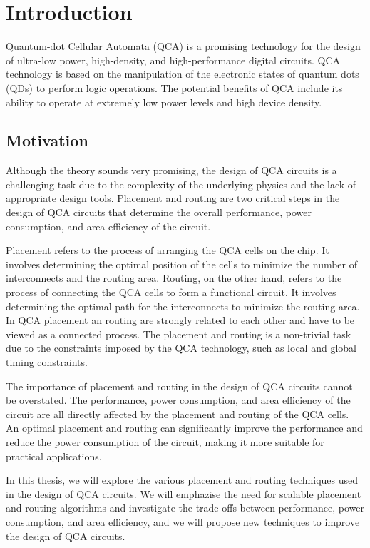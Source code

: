 
\chapter{Introduction}\label{chapter:introduction}
Quantum-dot Cellular Automata (QCA) is a promising technology for the design of ultra-low power, high-density, and high-performance digital circuits. QCA technology is based on the manipulation of the electronic states of quantum dots (QDs) to perform logic operations. The potential benefits of QCA include its ability to operate at extremely low power levels and high device density.

\section{Motivation}
Although the theory sounds very promising, the design of QCA circuits is a challenging task due to the complexity of the underlying physics and the lack of appropriate design tools. Placement and routing are two critical steps in the design of QCA circuits that determine the overall performance, power consumption, and area efficiency of the circuit.

Placement refers to the process of arranging the QCA cells on the chip. It involves determining the optimal position of the cells to minimize the number of interconnects and the routing area. Routing, on the other hand, refers to the process of connecting the QCA cells to form a functional circuit. It involves determining the optimal path for the interconnects to minimize the routing area. In QCA placement an routing are strongly related to each other and have to be viewed as a connected process. The placement and routing is a  non-trivial task due to the constraints imposed by the QCA technology, such as local and global timing constraints.

The importance of placement and routing in the design of QCA circuits cannot be overstated. The performance, power consumption, and area efficiency of the circuit are all directly affected by the placement and routing of the QCA cells. An optimal placement and routing can significantly improve the performance and reduce the power consumption of the circuit, making it more suitable for practical applications.

In this thesis, we will explore the various placement and routing techniques used in the design of QCA circuits. We will emphazise the need for scalable placement and routing algorithms and investigate the trade-offs between performance, power consumption, and area efficiency, and we will propose new techniques to improve the design of QCA circuits.

